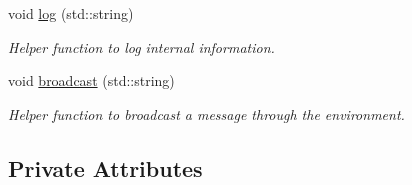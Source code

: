 \begin{DoxyCompactItemize}
void \hyperlink{class_aodv_aa72c819dabf72296d9fb98101c86775b}{log} (std\+::string)
\begin{DoxyCompactList}\small\item\em Helper function to log internal information. \end{DoxyCompactList}\item 
void \hyperlink{class_aodv_ae841153e0ece7036eb047a4e4ade0f4d}{broadcast} (std\+::string)
\begin{DoxyCompactList}\small\item\em Helper function to broadcast a message through the environment. \end{DoxyCompactList}\end{DoxyCompactItemize}
\subsection*{Private Attributes}
